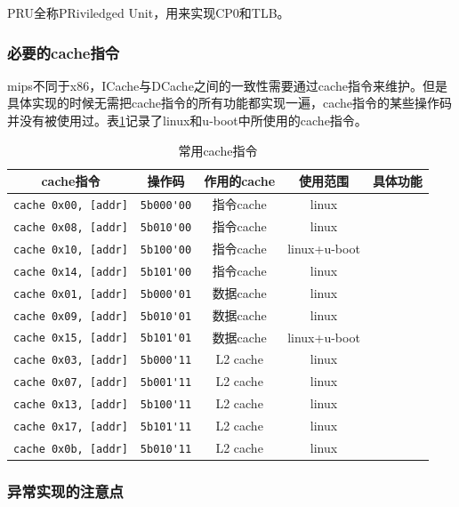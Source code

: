 \documentclass[lang=cn,11pt,a4paper]{elegantpaper}
\begin{document}
PRU全称PRiviledged Unit，用来实现CP0和TLB。

\subsubsection{必要的cache指令}

mips不同于x86，ICache与DCache之间的一致性需要通过cache指令来维护。但是具体实现的时候无需把cache指令的所有功能都实现一遍，cache指令的某些操作码并没有被使用过。表\ref{tab:cache_inst}记录了linux和u-boot中所使用的cache指令。

\begin{table}[H]
\centering
\begin{tabular}{|c|c|c|c|c|}
\hline
cache指令 & 操作码 & 作用的cache & 使用范围 & 具体功能 \\\hline
\hline
\lstinline!cache 0x00, [addr]! & \lstinline!5b000'00! & 指令cache & linux & \\\hline
\lstinline!cache 0x08, [addr]! & \lstinline!5b010'00! & 指令cache & linux & \\\hline
\lstinline!cache 0x10, [addr]! & \lstinline!5b100'00! & 指令cache & linux+u-boot & \\\hline
\lstinline!cache 0x14, [addr]! & \lstinline!5b101'00! & 指令cache & linux & \\\hline
\hline
\lstinline!cache 0x01, [addr]! & \lstinline!5b000'01! & 数据cache & linux & \\\hline
\lstinline!cache 0x09, [addr]! & \lstinline!5b010'01! & 数据cache & linux & \\\hline
\lstinline!cache 0x15, [addr]! & \lstinline!5b101'01! & 数据cache & linux+u-boot & \\\hline
\hline
\lstinline!cache 0x03, [addr]! & \lstinline!5b000'11! & L2 cache & linux & \\\hline
\lstinline!cache 0x07, [addr]! & \lstinline!5b001'11! & L2 cache & linux & \\\hline
\lstinline!cache 0x13, [addr]! & \lstinline!5b100'11! & L2 cache & linux & \\\hline
\lstinline!cache 0x17, [addr]! & \lstinline!5b101'11! & L2 cache & linux & \\\hline
\lstinline!cache 0x0b, [addr]! & \lstinline!5b010'11! & L2 cache & linux & \\\hline
\end{tabular}
\caption{常用cache指令}
\label{tab:cache_inst}
\end{table}

\subsubsection{异常实现的注意点}
\end{document}
